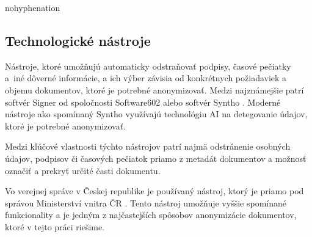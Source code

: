 \begin{hyphenrules}{nohyphenation}
\begin{figure}[h]
\begin{minipage}[b]{.45\linewidth}
\end{minipage}
\label{fig:1.1}
\end{figure}
\subsection{Technologické nástroje}
Nástroje, ktoré umožňujú automaticky odstraňovať podpisy, časové pečiatky a~iné dôverné informácie, a ich výber závisia od konkrétnych požiadaviek a objemu dokumentov, ktoré je potrebné anonymizovať. Medzi najznámejšie patrí softvér Signer od spoločnosti Software602 \cite{soft602} alebo softvér Syntho \cite{synthoai}. Moderné nástroje ako spomínaný Syntho využívajú technológiu AI na detegovanie údajov, ktoré je potrebné anonymizovať. 
\newline

Medzi kľúčové vlastnosti týchto nástrojov patrí najmä odstránenie osobných údajov, podpisov či časových pečiatok priamo z metadát dokumentov a možnosť označiť a prekryť určité časti dokumentu.

Vo verejnej správe v Českej republike je používaný nástroj, ktorý je priamo pod správou Ministerství vnitra ČR \cite{anonymizace-gov}. Tento nástroj umožňuje vyššie spomínané funkcionality a je jedným z najčastejších spôsobov anonymizácie dokumentov, ktoré v tejto práci riešime.
\end{hyphenrules}

